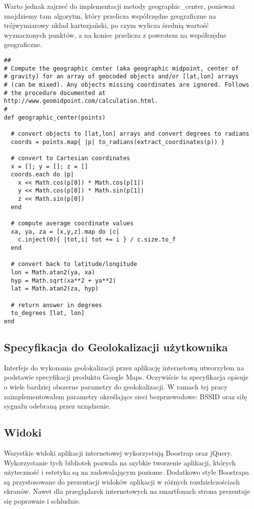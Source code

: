 Warto jednak zajrzeć do implementacji metody geographic\_center, ponieważ znajdziemy tam algorytm, który przelicza współrzędne geograficzne na trójwymiarowy układ kartezjański, po czym wylicza średnią wartość wyznaczonych punktów, a na koniec przelicza z powrotem na współrzędne geograficzne.

\begin{verbatim}
##
# Compute the geographic center (aka geographic midpoint, center of
# gravity) for an array of geocoded objects and/or [lat,lon] arrays
# (can be mixed). Any objects missing coordinates are ignored. Follows
# the procedure documented at http://www.geomidpoint.com/calculation.html.
#
def geographic_center(points)

  # convert objects to [lat,lon] arrays and convert degrees to radians
  coords = points.map{ |p| to_radians(extract_coordinates(p)) }

  # convert to Cartesian coordinates
  x = []; y = []; z = []
  coords.each do |p|
    x << Math.cos(p[0]) * Math.cos(p[1])
    y << Math.cos(p[0]) * Math.sin(p[1])
    z << Math.sin(p[0])
  end

  # compute average coordinate values
  xa, ya, za = [x,y,z].map do |c|
    c.inject(0){ |tot,i| tot += i } / c.size.to_f
  end

  # convert back to latitude/longitude
  lon = Math.atan2(ya, xa)
  hyp = Math.sqrt(xa**2 + ya**2)
  lat = Math.atan2(za, hyp)

  # return answer in degrees
  to_degrees [lat, lon]
end
\end{verbatim}

\subsection{Specyfikacja do Geolokalizacji użytkownika}
Interfejs do wykonania geolokalizacji przez aplikację internetową utworzyłem na podstawie specyfikacji produktu Google Maps.\cite{GoogleMapsGeolocationAPI} Oczywiście ta specyfikacja opisuje o wiele bardziej obszerne parametry do geolokalizacji. W ramach tej pracy zaimplementowałem parametry określające sieci bezprzewodowe: BSSID oraz siłę sygnału odebraną przez urządzenie.

\subsection{Widoki}
Wszystkie widoki aplikacji internetowej wykorzystują Boostrap oraz jQuery. Wykorzystanie tych bibliotek pozwala na szybkie tworzenie aplikacji, których użyteczność i estetyka są na zadowalającym poziome. Dodatkowo style Boostrapa są przystosowane do prezentacji widoków aplikacji w różnych rozdzielczościach ekranów. Nawet dla przeglądarek internetowych na smartfonach strona prezentuje się poprawnie i schludnie.
